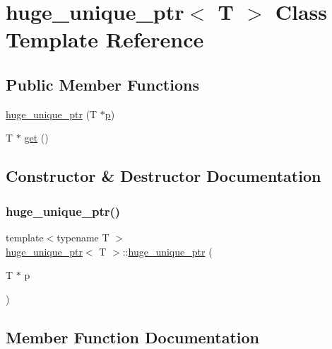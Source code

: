 \hypertarget{classhuge__unique__ptr}{}\section{huge\+\_\+unique\+\_\+ptr$<$ T $>$ Class Template Reference}
\label{classhuge__unique__ptr}
\subsection*{Public Member Functions}
\begin{DoxyCompactItemize}
\item 
\mbox{\hyperlink{classhuge__unique__ptr_a536717c68938abb824ada4188a6466f1}{huge\+\_\+unique\+\_\+ptr}} (T $\ast$\mbox{\hyperlink{_s_d_l__opengl__glext_8h_aa5367c14d90f462230c2611b81b41d23}{p}})
\item 
T $\ast$ \mbox{\hyperlink{classhuge__unique__ptr_a509dfae51d9e99876c6fd028961f4e60}{get}} ()
\end{DoxyCompactItemize}


\subsection{Constructor \& Destructor Documentation}
\mbox{\label{classhuge__unique__ptr_a536717c68938abb824ada4188a6466f1}} 
\subsubsection{\texorpdfstring{huge\_unique\_ptr()}{huge\_unique\_ptr()}}
{\footnotesize\ttfamily template$<$typename T $>$ \\
\mbox{\hyperlink{classhuge__unique__ptr}{huge\+\_\+unique\+\_\+ptr}}$<$ T $>$\+::\mbox{\hyperlink{classhuge__unique__ptr}{huge\+\_\+unique\+\_\+ptr}} (\begin{DoxyParamCaption}\item[{T $\ast$}]{p }\end{DoxyParamCaption})\hspace{0.3cm}{\ttfamily [inline]}}



\subsection{Member Function Documentation}
\mbox{\label{classhuge__unique__ptr_a509dfae51d9e99876c6fd028961f4e60}} 
